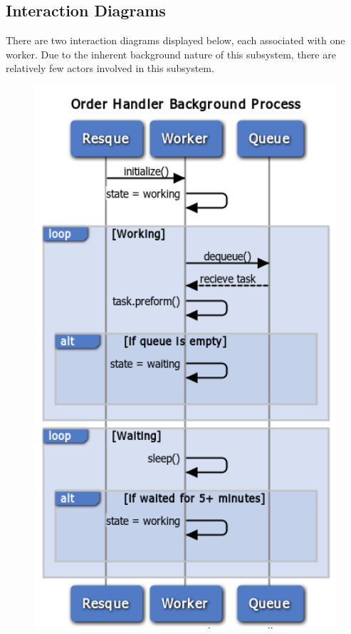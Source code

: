 \subsection{Interaction Diagrams}

There are two interaction diagrams displayed below, each associated with one worker. Due to the inherent background nature of this subsystem, there are relatively few actors involved in this subsystem.\\

\begin{figure}
\centering
\includegraphics[width=5.5in]{./Diagrams/ComponentModels/stateMachineDiagrams/Worker1/worker1.png}

\end{figure}
